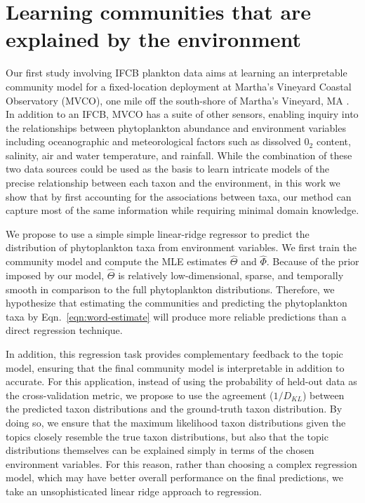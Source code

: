 \section{Learning communities that are explained by the environment} \label{sec:plankton-seasonal}
Our first study involving IFCB plankton data aims at learning an interpretable community model for a fixed-location deployment at Martha's Vineyard Coastal Observatory (MVCO), one mile off the south-shore of Martha's Vineyard, MA \citep{Kalmbach2017}. In addition to an IFCB, MVCO has a suite of other sensors, enabling inquiry into the relationships between phytoplankton abundance and environment variables including oceanographic and meteorological factors such as dissolved $\mathrm{0}_2$ content, salinity, air and water temperature, and rainfall. While the combination of these two data sources could be used as the basis to learn intricate models of the precise relationship between each taxon and the environment, in this work we show that by first accounting for the associations between taxa, our method can capture most of the same information while requiring minimal domain knowledge.

We propose to use a simple simple linear-ridge regressor to predict the distribution of phytoplankton taxa from environment variables. We first train the community model and compute the MLE estimates $\hat{\Theta}$ and $\hat{\Phi}$. Because of the prior imposed by our model, $\hat{\Theta}$ is relatively low-dimensional, sparse, and temporally smooth in comparison to the full phytoplankton distributions. Therefore, we hypothesize that estimating the communities and predicting the phytoplankton taxa by Eqn.~\ref{eqn:word-estimate} will produce more reliable predictions than a direct regression technique.

 In addition, this regression task provides complementary feedback to the topic model, ensuring that the final community model is interpretable in addition to accurate. For this application, instead of using the probability of held-out data as the cross-validation metric, we propose to use the agreement ($1/D_{KL}$) between the predicted taxon distributions and the ground-truth taxon distribution. By doing so, we ensure that the maximum likelihood taxon distributions given the topics closely resemble the true taxon distributions, but also that the topic distributions themselves can be explained simply in terms of the chosen environment variables. For this reason, rather than choosing a complex regression model, which may have better overall performance on the final predictions, we take an unsophisticated linear ridge approach to regression.

